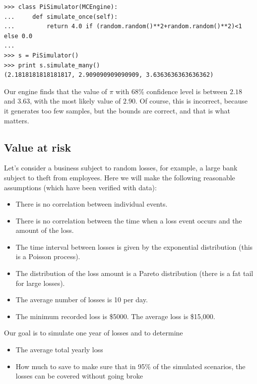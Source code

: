 \documentclass[justified,sixbynine]{tufte-book}
\theoremstyle{plain}%
\theoremstyle{definition}
\theoremstyle{remark}
\begin{document}
\begin{fullwidth}

\begin{lstlisting}
>>> class PiSimulator(MCEngine):
...     def simulate_once(self):
...         return 4.0 if (random.random()**2+random.random()**2)<1 else 0.0
...
>>> s = PiSimulator()
>>> print s.simulate_many()
(2.1818181818181817, 2.909090909090909, 3.6363636363636362)
\end{lstlisting}

Our engine finds that the value of $\pi$ with 68\% confidence level is between $2.18$ and $3.63$, with the most likely value of $2.90$. Of course, this is incorrect, because it generates too few samples, but the bounds are correct, and that is what matters.

\subsection{Value at risk}

Let's consider a business subject to random losses, for example, a large bank subject to theft from employees.
Here we will make the following reasonable assumptions (which have been verified with data):
\begin{itemize}
\item There is no correlation between individual events.
\item There is no correlation between the time when a loss event occurs and the amount of the loss.
\item The time interval between losses is given by the exponential distribution (this is a Poisson process).
\item The distribution of the loss amount is a Pareto distribution (there is a fat tail for large losses).
\item The average number of losses is 10 per day.
\item The minimum recorded loss is \$5000. The average loss is \$15,000.
\end{itemize}

Our goal is to simulate one year of losses and to determine

\begin{itemize}
\item The average total yearly loss
\item How much to save to make sure that in 95\% of the simulated scenarios, the losses can be covered without going broke
\end{itemize}


\end{fullwidth}
\end{document}
